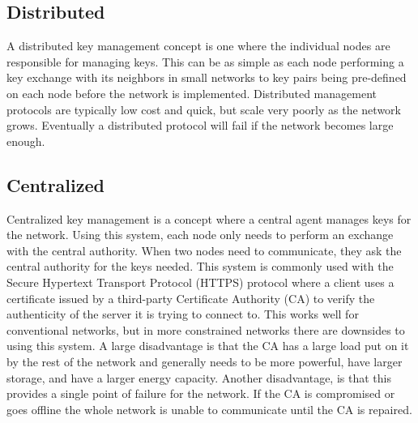 \documentclass[journal]{IEEEtran}
\begin{document}
\subsection{Distributed}
A distributed key management concept is one where the individual nodes are responsible for managing keys. This can be as simple as each node performing a key exchange with its neighbors in small networks to key pairs being pre-defined on each node before the network is implemented. Distributed management protocols are typically low cost and quick, but scale very poorly as the network grows. Eventually a distributed protocol will fail if the network becomes large enough.
\subsection{Centralized}
Centralized key management is a concept where a central agent manages keys for the network. Using this system, each node only needs to perform an exchange with the central authority. When two nodes need to communicate, they ask the central authority for the keys needed. This system is commonly used with the Secure Hypertext Transport Protocol (HTTPS) protocol where a client uses a certificate issued by a third-party Certificate Authority (CA) to verify the authenticity of the server it is trying to connect to. This works well for conventional networks, but in more constrained networks there are downsides to using this system. A large disadvantage is that the CA has a large load put on it by the rest of the network and generally needs to be more powerful, have larger storage, and have a larger energy capacity. Another disadvantage, is that this provides a single point of failure for the network. If the CA is compromised or goes offline the whole network is unable to communicate until the CA is repaired.
\end{document}
